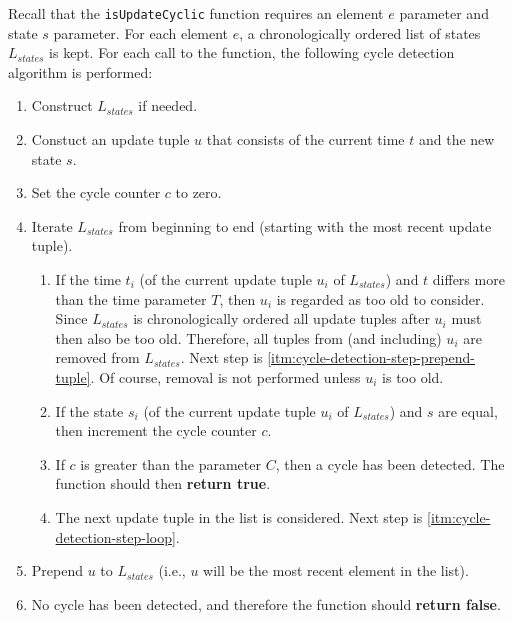 \documentclass[a4paper,11pt]{kth-mag}
\newcommand{\code}[1]{\texttt{#1}}
\begin{document}
        Recall that the \code{isUpdateCyclic} function requires an element $e$ parameter and state $s$ parameter.
        For each element $e$, a chronologically ordered list of states $L_{states}$ is kept.
        For each call to the function, the following cycle detection algorithm is performed:
        \begin{enumerate}
          \item Construct $L_{states}$ if needed.
          \item Constuct an update tuple $u$ that consists of the current time $t$ and the new state $s$.
          \item Set the cycle counter $c$ to zero.
          \item Iterate $L_{states}$ from beginning to end (starting with the most recent update tuple).
          \begin{enumerate}
            \item\label{itm:cycle-detection-step-loop}
              If the time $t_i$ (of the current update tuple $u_i$ of $L_{states}$) and $t$ differs more than the time parameter $T$, then $u_i$ is regarded as too old to consider.
              Since $L_{states}$ is chronologically ordered all update tuples after $u_i$ must then also be too old.
              Therefore, all tuples from (and including) $u_i$ are removed from $L_{states}$.
              Next step is \ref{itm:cycle-detection-step-prepend-tuple}.
              Of course, removal is not performed unless $u_i$ is too old.
            \item If the state $s_i$ (of the current update tuple $u_i$ of $L_{states}$) and $s$ are equal, then increment the cycle counter $c$.
            \item If $c$ is greater than the parameter $C$, then a cycle has been detected. The function should then \textbf{return true}.
            \item The next update tuple in the list is considered. Next step is \ref{itm:cycle-detection-step-loop}.
          \end{enumerate}
          \item\label{itm:cycle-detection-step-prepend-tuple} Prepend $u$ to $L_{states}$ (i.e., $u$ will be the most recent element in the list).
          \item No cycle has been detected, and therefore the function should \textbf{return false}.
        \end{enumerate}

\end{document}
